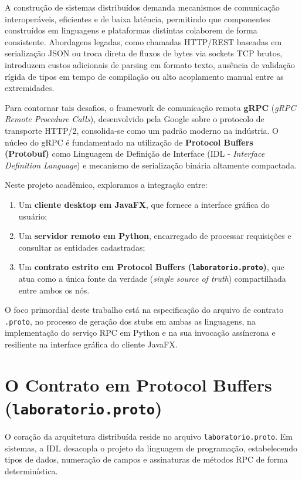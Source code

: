 \documentclass[12pt,a4paper]{article}
\begin{document}
A construção de sistemas distribuídos demanda mecanismos de comunicação interoperáveis, eficientes e de baixa latência, permitindo que componentes construídos em linguagens e plataformas distintas colaborem de forma consistente. Abordagens legadas, como chamadas HTTP/REST baseadas em serialização JSON ou troca direta de fluxos de bytes via sockets TCP brutos, introduzem custos adicionais de parsing em formato texto, ausência de validação rígida de tipos em tempo de compilação ou alto acoplamento manual entre as extremidades.

Para contornar tais desafios, o framework de comunicação remota \textbf{gRPC} (\textit{gRPC Remote Procedure Calls}), desenvolvido pela Google sobre o protocolo de transporte HTTP/2, consolida-se como um padrão moderno na indústria. O núcleo do gRPC é fundamentado na utilização de \textbf{Protocol Buffers (Protobuf)} como Linguagem de Definição de Interface (IDL - \textit{Interface Definition Language}) e mecanismo de serialização binária altamente compactada.

Neste projeto acadêmico, exploramos a integração entre:
\begin{enumerate}
    \item Um \textbf{cliente desktop em JavaFX}, que fornece a interface gráfica do usuário;
    \item Um \textbf{servidor remoto em Python}, encarregado de processar requisições e consultar as entidades cadastradas;
    \item Um \textbf{contrato estrito em Protocol Buffers (\texttt{laboratorio.proto})}, que atua como a única fonte da verdade (\textit{single source of truth}) compartilhada entre ambos os nós.
\end{enumerate}

O foco primordial deste trabalho está na especificação do arquivo de contrato \texttt{.proto}, no processo de geração dos stubs em ambas as linguagens, na implementação do serviço RPC em Python e na sua invocação assíncrona e resiliente na interface gráfica do cliente JavaFX.

\section{O Contrato em Protocol Buffers (\texttt{laboratorio.proto})}

O coração da arquitetura distribuída reside no arquivo \texttt{laboratorio.proto}. Em sistemas, a IDL desacopla o projeto da linguagem de programação, estabelecendo tipos de dados, numeração de campos e assinaturas de métodos RPC de forma determinística.
\end{document}
